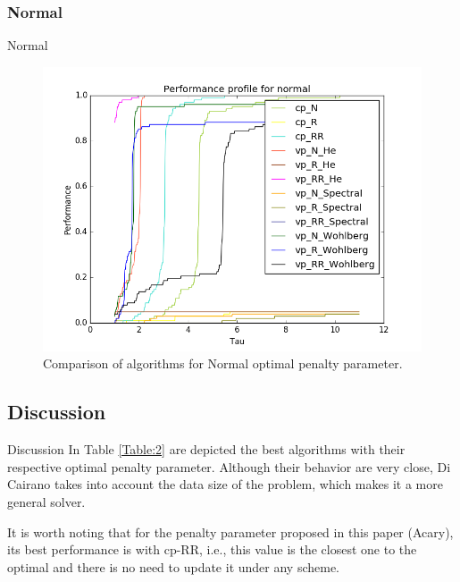 \documentclass[8pt,red]{beamer}
\theoremstyle{plain}
\theoremstyle{definition}
\theoremstyle{remark}
\begin{document}
\subsubsection{Normal}
\begin{frame}{Normal}
\begin{figure}[hbtp]
\centering
\includegraphics[scale=0.4]{Results/Normal_mini.png}
\caption{Comparison of algorithms for Normal optimal penalty parameter.}
\end{figure}
\end{frame}

\subsection{Discussion}
\begin{frame}{Discussion}
In Table \ref{Table:2} are depicted the best algorithms with their respective optimal penalty parameter. Although their behavior are very close, Di Cairano takes into account the data size of the problem, which makes it a more general solver.

\begin{table}[h!]
\caption{Comparison of best algorithms.}
\label{Table:2}
\end{table}


It is worth noting that for the penalty parameter proposed in this paper (Acary), its best performance is with cp-RR, i.e., this value is the closest one to the optimal and there is no need to update it under any scheme.
\end{frame}
\end{document}
